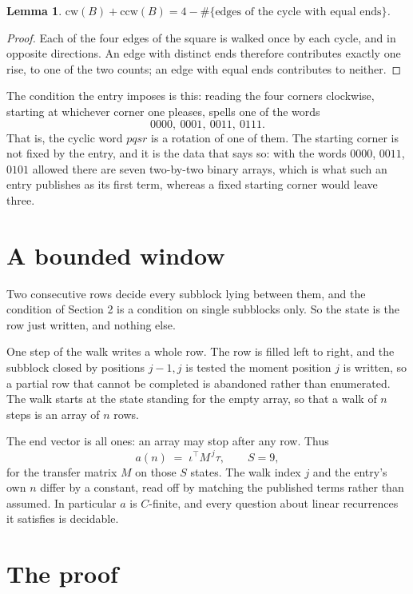 \documentclass[11pt,a4paper]{article}
\theoremstyle{plain}
\newtheorem{lemma}[theorem]{Lemma}
\theoremstyle{definition}
\begin{document}
\begin{lemma}\label{lem:sum}
$\mathrm{cw}(B)+\mathrm{ccw}(B)=4-\#\{\text{edges of the cycle with equal ends}\}$.
\end{lemma}

\begin{proof}
Each of the four edges of the square is walked once by each cycle, and in opposite directions.
An edge with distinct ends therefore contributes exactly one rise, to one of the two counts;
an edge with equal ends contributes to neither.
\end{proof}

The condition the entry imposes is this: reading the four corners clockwise, starting at whichever corner one pleases, spells one of the words
\[
0000,\ 0001,\ 0011,\ 0111.
\]
That is, the cyclic word $pqsr$ is a rotation of one of them. The starting corner is not fixed by the entry, and it is the data that says so: with the words $0000$, $0011$, $0101$ allowed there are seven two-by-two binary arrays, which is what such an entry publishes as its first term, whereas a fixed starting corner would leave three.

\section{A bounded window}

Two consecutive rows decide every subblock lying between them, and the condition of Section 2 is a condition on single subblocks only. So the state is the row just written, and nothing else.

One step of the walk writes a whole row. The row is filled left to right, and the subblock
closed by positions $j-1,j$ is tested the moment position $j$ is written, so a partial row that
cannot be completed is abandoned rather than enumerated. The walk starts at the state standing
for the empty array, so that a walk of $n$ steps is an array of $n$ rows.

The end vector is all ones: an array may stop after any row. Thus
\[
a(n)\;=\;\iota^{\!\top}M^{\,j}\tau ,\qquad S=9,
\]
for the transfer matrix $M$ on those $S$ states. The walk index $j$ and the entry's own $n$
differ by a constant, read off by matching the published terms rather than assumed. In
particular $a$ is $C$-finite, and every question about linear recurrences it satisfies is
decidable.

\section{The proof}
\end{document}
